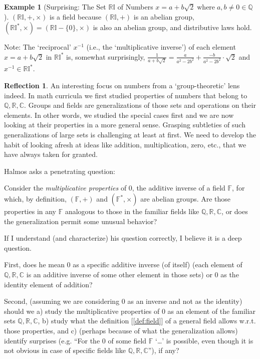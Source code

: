 \documentclass[english,notitlepage,smartquotes]{hgbreport}
\theoremstyle{definition}
\theoremstyle{definition}
\theoremstyle{remark}
\theoremstyle{definition}
\newtheorem{example}{Example}
\theoremstyle{plain}
\theoremstyle{definition}
\newtheorem{reflection}{Reflection}
\begin{document}
\begin{example}[Surprising: The Set $\mathbb{RI}$ of Numbers $x=a+b\sqrt{2}\; \text{where}\;a,b\ne0\in\mathbb{Q}$]
$(\mathbb{RI},+,\times)$ is a field because $(\mathbb{RI},+)$ is an abelian group, $(\mathbb{RI^*},\times)=(\mathbb{RI}-\{0\},\times)$ is also an abelian group, and distributive laws hold.

Note: The `reciprocal' $x^{-1}$ (i.e., the `multiplicative inverse') of each element $x=a+b\sqrt{2}$ in $\mathbb{RI^*}$ is, somewhat surprisingly, $\frac{1}{a+b\sqrt{2}}=\frac{a}{a^2-2b^2}+\frac{-b}{a^2-2b^2}\cdot\sqrt{2}$ and $x^{-1}\in\mathbb{RI^*}$. 

\end{example}
\begin{reflection}
An interesting focus on numbers from a `group-theoretic' lens indeed. In math curricula we first studied properties of numbers that belong to $\mathbb{Q},\mathbb{R},\mathbb{C}$. Groups and fields are generalizations of those sets and operations on their elements. In other words, we studied the special cases first and we are now looking at their properties in a more general sense. Grasping subtleties of such generalizations of large sets is challenging at least at first. We need to develop the habit of looking afresh at ideas like addition, multiplication, zero, etc., that we have always taken for granted. 

Halmos asks a penetrating question:

\begin{sidebar}
Consider the \emph{multiplicative properties} of $0$, the additive inverse of a field $\mathbb{F}$, for which, by definition, $(\mathbb{F},+)$ and $(\mathbb{F^*},\times)$ are abelian groups. Are those properties in any $\mathbb{F}$ analogous to those in the familiar fields like $\mathbb{Q},\mathbb{R},\mathbb{C}$, or does the generalization permit some unusual behavior?
\end{sidebar}

If I understand (and characterize) his question correctly, I believe it is a deep question. 

First, does he mean $0$ as a specific additive inverse (of itself) (each element of $\mathbb{Q},\mathbb{R},\mathbb{C}$ is an additive inverse of some other element in those sets) or $0$ as the identity element of addition?

Second, (assuming we are considering 0 as an inverse and not as the identity) should we a) study the multiplicative properties of 0 as an element of the familiar sets $\mathbb{Q},\mathbb{R},\mathbb{C}$, b) study what the definition [\ref{def:field}] of a general field allows w.r.t. those properties, and c) (perhaps because of what the generalization allows) identify surprises (e.g. ``For the 0 of some field $\mathbb{F}$ `\dots' is possible, even though it is not obvious in case of specific fields like $\mathbb{Q},\mathbb{R},\mathbb{C}$''), if any?
\end{reflection}
\end{document}
